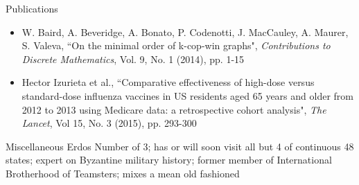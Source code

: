 \documentclass{resume} %
\begin{document}
\begin{rSection}{Publications}
\begin{itemize}
    \item W. Baird, A. Beveridge, A. Bonato, P. Codenotti, J. MacCauley, A. Maurer, S. Valeva, ``On the minimal order of k-cop-win graphs", {\em Contributions to Discrete Mathematics}, Vol. 9, No. 1 (2014), pp. 1-15 
    \item Hector Izurieta et al., ``Comparative effectiveness of high-dose versus standard-dose influenza vaccines in US residents aged 65 years and older from 2012 to 2013 using Medicare data: a retrospective cohort analysis", {\em The Lancet}, Vol 15, No. 3 (2015), pp. 293-300 
\end{itemize}
\end{rSection}



\begin{rSection}{Miscellaneous} 
    Erdos Number of 3; has or will soon visit all but 4 of continuous 48 states; expert on Byzantine military history; former member of International Brotherhood of Teamsters; mixes a mean old fashioned
\end{rSection}






\end{document}

